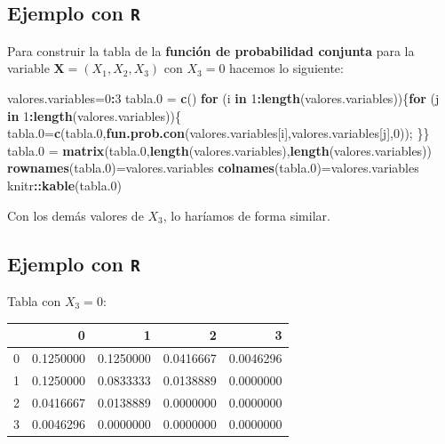\documentclass[]{book}
\newenvironment{Shaded}{\begin{snugshade}}{\end{snugshade}}
\newcommand{\ControlFlowTok}[1]{\textcolor[rgb]{0.13,0.29,0.53}{\textbf{#1}}}
\newcommand{\DecValTok}[1]{\textcolor[rgb]{0.00,0.00,0.81}{#1}}
\newcommand{\FloatTok}[1]{\textcolor[rgb]{0.00,0.00,0.81}{#1}}
\newcommand{\KeywordTok}[1]{\textcolor[rgb]{0.13,0.29,0.53}{\textbf{#1}}}
\newcommand{\NormalTok}[1]{#1}
\newcommand{\OperatorTok}[1]{\textcolor[rgb]{0.81,0.36,0.00}{\textbf{#1}}}
\newcommand{\StringTok}[1]{\textcolor[rgb]{0.31,0.60,0.02}{#1}}
\begin{document}
\hypertarget{ejemplo-con-r-11}{%
\subsection{\texorpdfstring{Ejemplo con \texttt{R}}{Ejemplo con R}}\label{ejemplo-con-r-11}}

Para construir la tabla de la \textbf{función de probabilidad conjunta} para la variable \(\mathbf{X}=(X_1,X_2,X_3)\) con \(X_3=0\) hacemos lo siguiente:

\begin{Shaded}
\begin{Highlighting}[]
\NormalTok{valores.variables=}\DecValTok{0}\OperatorTok{:}\DecValTok{3}
\NormalTok{tabla}\FloatTok{.0}\NormalTok{ =}\StringTok{ }\KeywordTok{c}\NormalTok{()}
\ControlFlowTok{for}\NormalTok{ (i }\ControlFlowTok{in} \DecValTok{1}\OperatorTok{:}\KeywordTok{length}\NormalTok{(valores.variables))\{}\ControlFlowTok{for}\NormalTok{ (j }\ControlFlowTok{in} \DecValTok{1}\OperatorTok{:}\KeywordTok{length}\NormalTok{(valores.variables))\{}
\NormalTok{  tabla}\FloatTok{.0}\NormalTok{=}\KeywordTok{c}\NormalTok{(tabla}\FloatTok{.0}\NormalTok{,}\KeywordTok{fun.prob.con}\NormalTok{(valores.variables[i],valores.variables[j],}\DecValTok{0}\NormalTok{));}
\NormalTok{\}\}}
\NormalTok{tabla}\FloatTok{.0}\NormalTok{ =}\StringTok{ }\KeywordTok{matrix}\NormalTok{(tabla}\FloatTok{.0}\NormalTok{,}\KeywordTok{length}\NormalTok{(valores.variables),}\KeywordTok{length}\NormalTok{(valores.variables))}
\KeywordTok{rownames}\NormalTok{(tabla}\FloatTok{.0}\NormalTok{)=valores.variables}
\KeywordTok{colnames}\NormalTok{(tabla}\FloatTok{.0}\NormalTok{)=valores.variables}
\NormalTok{knitr}\OperatorTok{::}\KeywordTok{kable}\NormalTok{(tabla}\FloatTok{.0}\NormalTok{)}
\end{Highlighting}
\end{Shaded}

Con los demás valores de \(X_3\), lo haríamos de forma similar.

\hypertarget{ejemplo-con-r-12}{%
\subsection{\texorpdfstring{Ejemplo con \texttt{R}}{Ejemplo con R}}\label{ejemplo-con-r-12}}

Tabla con \(X_3=0\):

\begin{tabular}{l|r|r|r|r}
\hline
  & 0 & 1 & 2 & 3\\
\hline
0 & 0.1250000 & 0.1250000 & 0.0416667 & 0.0046296\\
\hline
1 & 0.1250000 & 0.0833333 & 0.0138889 & 0.0000000\\
\hline
2 & 0.0416667 & 0.0138889 & 0.0000000 & 0.0000000\\
\hline
3 & 0.0046296 & 0.0000000 & 0.0000000 & 0.0000000\\
\hline
\end{tabular}
\end{document}
